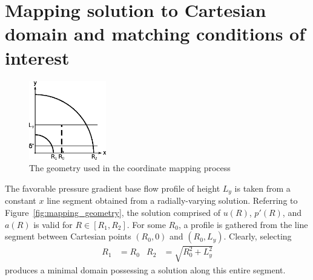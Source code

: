 \documentclass[letterpaper,11pt,nointlimits,reqno]{amsart}
\begin{document}
\section{Mapping solution to Cartesian domain and matching conditions of interest}

\begin{figure}[h]
  \centering
  \includegraphics[width=0.30\textwidth]{baseflow_schematic}
  \caption{
      \label{fig:mapping_geometry}
      The geometry used in the coordinate mapping process
  }
\end{figure}

The favorable pressure gradient base flow profile of height $L_y$ is taken from
a constant $x$ line segment obtained from a radially-varying solution.
Referring to Figure~\eqref{fig:mapping_geometry}, the solution comprised of
$u\!\left(R\right)$, $p'\!\left(R\right)$, and $a\!\left(R\right)$ is valid for
$R\in\left[R_1,R_2\right]$.  For some $R_0$, a profile is gathered from the
line segment between Cartesian points $\left(R_0,0\right)$ and
$\left(R_0,L_y\right)$.  Clearly, selecting
\begin{align}
  R_1 &= R_0
&
  R_2 &= \sqrt{R_0^2 + L_y^2}
\end{align}
produces a minimal domain possessing a solution along this entire segment.
\end{document}
